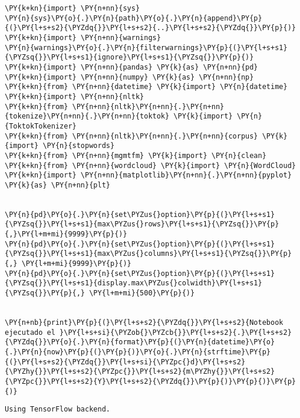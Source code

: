     \begin{tcolorbox}[breakable, size=fbox, boxrule=1pt, pad at break*=1mm,colback=cellbackground, colframe=cellborder]
\begin{Verbatim}[commandchars=\\\{\}]
\PY{k+kn}{import} \PY{n+nn}{sys}
\PY{n}{sys}\PY{o}{.}\PY{n}{path}\PY{o}{.}\PY{n}{append}\PY{p}{(}\PY{l+s+s2}{\PYZdq{}}\PY{l+s+s2}{..}\PY{l+s+s2}{\PYZdq{}}\PY{p}{)}
\PY{k+kn}{import} \PY{n+nn}{warnings}
\PY{n}{warnings}\PY{o}{.}\PY{n}{filterwarnings}\PY{p}{(}\PY{l+s+s1}{\PYZsq{}}\PY{l+s+s1}{ignore}\PY{l+s+s1}{\PYZsq{}}\PY{p}{)}
\PY{k+kn}{import} \PY{n+nn}{pandas} \PY{k}{as} \PY{n+nn}{pd}
\PY{k+kn}{import} \PY{n+nn}{numpy} \PY{k}{as} \PY{n+nn}{np}
\PY{k+kn}{from} \PY{n+nn}{datetime} \PY{k}{import} \PY{n}{datetime}
\PY{k+kn}{import} \PY{n+nn}{nltk}
\PY{k+kn}{from} \PY{n+nn}{nltk}\PY{n+nn}{.}\PY{n+nn}{tokenize}\PY{n+nn}{.}\PY{n+nn}{toktok} \PY{k}{import} \PY{n}{ToktokTokenizer}
\PY{k+kn}{from} \PY{n+nn}{nltk}\PY{n+nn}{.}\PY{n+nn}{corpus} \PY{k}{import} \PY{n}{stopwords}
\PY{k+kn}{from} \PY{n+nn}{mgmtfm} \PY{k}{import} \PY{n}{clean}
\PY{k+kn}{from} \PY{n+nn}{wordcloud} \PY{k}{import} \PY{n}{WordCloud}
\PY{k+kn}{import} \PY{n+nn}{matplotlib}\PY{n+nn}{.}\PY{n+nn}{pyplot} \PY{k}{as} \PY{n+nn}{plt}


\PY{n}{pd}\PY{o}{.}\PY{n}{set\PYZus{}option}\PY{p}{(}\PY{l+s+s1}{\PYZsq{}}\PY{l+s+s1}{max\PYZus{}rows}\PY{l+s+s1}{\PYZsq{}}\PY{p}{,}\PY{l+m+mi}{9999}\PY{p}{)}
\PY{n}{pd}\PY{o}{.}\PY{n}{set\PYZus{}option}\PY{p}{(}\PY{l+s+s1}{\PYZsq{}}\PY{l+s+s1}{max\PYZus{}columns}\PY{l+s+s1}{\PYZsq{}}\PY{p}{,} \PY{l+m+mi}{9999}\PY{p}{)}
\PY{n}{pd}\PY{o}{.}\PY{n}{set\PYZus{}option}\PY{p}{(}\PY{l+s+s1}{\PYZsq{}}\PY{l+s+s1}{display.max\PYZus{}colwidth}\PY{l+s+s1}{\PYZsq{}}\PY{p}{,} \PY{l+m+mi}{500}\PY{p}{)}


\PY{n+nb}{print}\PY{p}{(}\PY{l+s+s2}{\PYZdq{}}\PY{l+s+s2}{Notebook ejecutado el }\PY{l+s+si}{\PYZob{}\PYZcb{}}\PY{l+s+s2}{.}\PY{l+s+s2}{\PYZdq{}}\PY{o}{.}\PY{n}{format}\PY{p}{(}\PY{n}{datetime}\PY{o}{.}\PY{n}{now}\PY{p}{(}\PY{p}{)}\PY{o}{.}\PY{n}{strftime}\PY{p}{(}\PY{l+s+s2}{\PYZdq{}}\PY{l+s+si}{\PYZpc{}d}\PY{l+s+s2}{\PYZhy{}}\PY{l+s+s2}{\PYZpc{}}\PY{l+s+s2}{m\PYZhy{}}\PY{l+s+s2}{\PYZpc{}}\PY{l+s+s2}{Y}\PY{l+s+s2}{\PYZdq{}}\PY{p}{)}\PY{p}{)}\PY{p}{)}
\end{Verbatim}
\end{tcolorbox}

    \begin{Verbatim}[commandchars=\\\{\}]
Using TensorFlow backend.
    \end{Verbatim}

